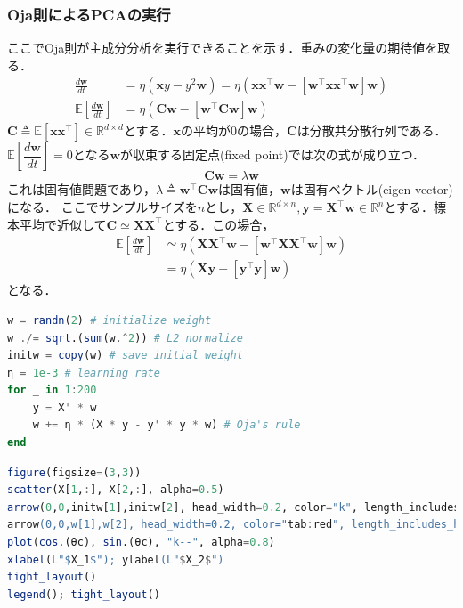 \subsubsection{Oja則によるPCAの実行}
ここでOja則が主成分分析を実行できることを示す．重みの変化量の期待値を取る．
\begin{align}
\frac{d\mathbf{w}}{dt} &= \eta \left(\mathbf{x}y - y^2 \mathbf{w}\right)=\eta \left(\mathbf{x}\mathbf{x}^\top \mathbf{w} - \left[\mathbf{w}^\top \mathbf{x}\mathbf{x}^\top \mathbf{w}\right] \mathbf{w}\right)\\
\mathbb{E}\left[\frac{d\mathbf{w}}{dt}\right] &= \eta \left(\mathbf{C} \mathbf{w} - \left[\mathbf{w}^\top \mathbf{C} \mathbf{w}\right] \mathbf{w}\right)
\end{align}
$\mathbf{C}\triangleq\mathbb{E}[\mathbf{x}\mathbf{x}^\top]\in \mathbb{R}^{d\times d}$とする．$\mathbf{x}$の平均が0の場合，$\mathbf{C}$は分散共分散行列である．$\mathbb{E}\left[\dfrac{d\mathbf{w}}{dt}\right]=0$となる$\mathbf{w}$が収束する固定点(fixed point)では次の式が成り立つ．
\begin{equation}
\mathbf{C}\mathbf{w} = \lambda \mathbf{w}
\end{equation}
これは固有値問題であり，$\lambda\triangleq\mathbf{w}^\top \mathbf{C} \mathbf{w}$は固有値，$\mathbf{w}$は固有ベクトル(eigen vector)になる．
ここでサンプルサイズを$n$とし，$\mathbf{X} \in \mathbb{R}^{d\times n}, \mathbf{y}=\mathbf{X}^\top\mathbf{w} \in \mathbb{R}^n$とする．標本平均で近似して$\mathbf{C}\simeq \mathbf{X}\mathbf{X}^\top$とする．この場合，
\begin{align}
\mathbb{E}\left[\frac{d\mathbf{w}}{dt}\right] &\simeq \eta \left(\mathbf{X}\mathbf{X}^\top \mathbf{w} - \left[\mathbf{w}^\top \mathbf{X}\mathbf{X}^\top \mathbf{w}\right] \mathbf{w}\right)\\
&=\eta \left(\mathbf{X}\mathbf{y} - \left[\mathbf{y}^\top\mathbf{y}\right] \mathbf{w}\right)
\end{align}
となる．
\begin{lstlisting}[language=julia]
w = randn(2) # initialize weight
w ./= sqrt.(sum(w.^2)) # L2 normalize
initw = copy(w) # save initial weight
η = 1e-3 # learning rate
for _ in 1:200
    y = X' * w  
    w += η * (X * y - y' * y * w) # Oja's rule
end
\end{lstlisting}
\begin{lstlisting}[language=julia]
figure(figsize=(3,3))
scatter(X[1,:], X[2,:], alpha=0.5)
arrow(0,0,initw[1],initw[2], head_width=0.2, color="k", length_includes_head=true, label=L"Init. $w$")
arrow(0,0,w[1],w[2], head_width=0.2, color="tab:red", length_includes_head=true, label=L"Opt. $w$")
plot(cos.(θc), sin.(θc), "k--", alpha=0.8)
xlabel(L"$X_1$"); ylabel(L"$X_2$")
tight_layout()
legend(); tight_layout()
\end{lstlisting}
